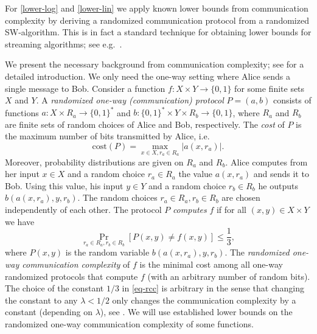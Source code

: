 \documentclass{article}\usepackage[a4paper,margin=20mm]{geometry}
\renewcommand{\leq}{\leqslant}
\renewcommand{\le}{\leq}
\begin{document}
For \ref{lower-log} and \ref{lower-lin}
we apply known lower bounds from communication complexity
by deriving a randomized communication protocol from 
a randomized SW-algorithm.
This is in fact a standard technique for obtaining lower bounds for streaming algorithms; see e.g.~\cite{Roughgarden16}.

We present the necessary background from communication complexity; see \cite{KushilevitzN97}
for a detailed introduction.  
We only need the one-way setting where Alice sends a single message to Bob.
Consider a function $f \colon X \times Y \to \{0,1\}$ for some finite sets $X$ and $Y$.
A {\em randomized one-way (communication) protocol} $P=(a,b)$ consists of functions
$a \colon X\times R_a \to \{0,1\}^*$ and $b \colon \{0,1\}^* \times Y \times R_b \to\{0,1\}$, where
$R_a$ and $R_b$ are finite sets of random choices of Alice and Bob, respectively.
The {\em cost} of $P$ is the maximum number of bits transmitted by Alice, i.e.
\[
	\mathrm{cost}(P) = \max_{x \in X, r_a \in R_a} |a(x,r_a)|. 
\]
Moreover, probability distributions are given on $R_a$ and $R_b$.
Alice computes from her input $x \in X$ and a random choice $r_a \in R_a$
the value $a(x,r_a)$ and sends it to Bob.
Using this value, his input $y \in Y$ and a random choice $r_b \in R_b$
he outputs $b(a(x,r_a),y,r_b)$. 
The random choices $r_a \in R_a, r_b \in R_b$ are chosen independently of each other.
The protocol $P$ {\em computes} $f$ if 
for all $(x,y) \in X \times Y$ we have
\begin{equation} \label{eq-rcc}
\Pr_{r_a \in R_a, r_b \in R_b}[P(x,y) \neq f(x,y)] \le \frac{1}{3},
\end{equation}
where $P(x,y)$ is the random variable $b(a(x,r_a),y,r_b)$.
The {\em randomized one-way communication complexity} of $f$ is the minimal cost
among all one-way randomized protocols that compute $f$ (with an arbitrary number of random bits).
The choice of the constant $1/3$ in \eqref{eq-rcc} is arbitrary in the sense that changing the constant
to any $\lambda < 1/2$ only changes the communication complexity
by a constant (depending on $\lambda$),
see \cite[p.~30]{KushilevitzN97}.
We will use established lower bounds on the randomized one-way communication complexity of some functions.
\end{document}
